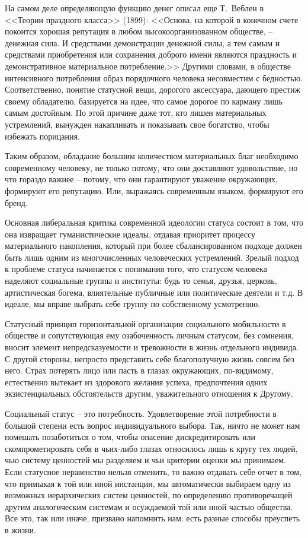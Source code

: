 На самом деле определяющую функцию денег описал еще Т.~Веблен в <<Теории
праздного класса>> (1899): <<Основа, на которой в конечном счете покоится
хорошая репутация в любом высокоорганизованном обществе, -- денежная сила.
И средствами демонстрации денежной силы, а тем самым и средствами приобретения
или сохранения доброго имени являются праздность и демонстративное материальное
потребление.>>\autocite[][120]{veblen1984teoria} Другими словами, в обществе
интенсивного потребления образ порядочного человека несовместим с бедностью.
Соответственно, понятие статусной вещи, дорогого аксессуара, дающего престиж
своему обладателю, базируется на идее, что самое дорогое по карману лишь самым
достойным. По этой причине даже тот, кто лишен материальных устремлений, вынужден
накапливать и показывать свое богатство, чтобы избежать порицания.

Таким образом, обладание большим количеством материальных благ необходимо
современному человеку, не только потому, что они доставляют удовольствие, но что
гораздо важнее -- потому, что они гарантируют уважение окружающих, формируют его
репутацию. Или, выражаясь современным языком, формируют его бренд.

Основная либеральная критика современной идеологии  статуса состоит в том, что
она извращает гуманистические идеалы, отдавая приоритет процессу материального
накопления, который при более сбалансированном подходе должен быть лишь одним
из многочисленных человеческих устремлений. Зрелый подход к проблеме статуса
начинается с понимания того, что статусом человека наделяют социальные группы и
институты: будь то семья, друзья, церковь, артистическая богема, влиятельные
публичные или политические деятели и т.д. В идеале, мы вправе выбрать себе
группу по собственному усмотрению.

Статусный принцип горизонтальной организации социального мобильности в обществе
и сопутствующая ему озабоченность личным статусом, без сомнения, вносит элемент
непредсказуемости и тревожности в жизнь отдельного индивида. С другой стороны,
непросто представить себе благополучную жизнь совсем без него. Страх потерять
лицо или пасть в глазах окружающих, по-видимому, естественно вытекает из здорового
желания успеха, предпочтения одних экзистенциальных обстоятельств другим,
уважительного отношения к Другому.

Социальный статус -- это потребность. Удовлетворение этой потребности в большой
степени есть вопрос индивидуального выбора. Так, ничто не может нам помешать
позаботиться о том, чтобы опасение дискредитировать или скомпрометировать себя в
чьих-либо глазах относилось лишь к кругу тех людей, чью систему ценностей мы
разделяем и чьи критерии оценки мы принимаем. Если статусное неравенство нельзя
отменить, то важно отдавать себе отчет в том, что примыкая к той или иной
инстанции, мы автоматически выбираем одну из возможных иерархических систем
ценностей, по определению противоречащей другим аналогическим системам и
осуждаемой той или иной частью общества. Все это, так или иначе, призвано
напомнить нам: есть разные способы преуспеть в жизни.

